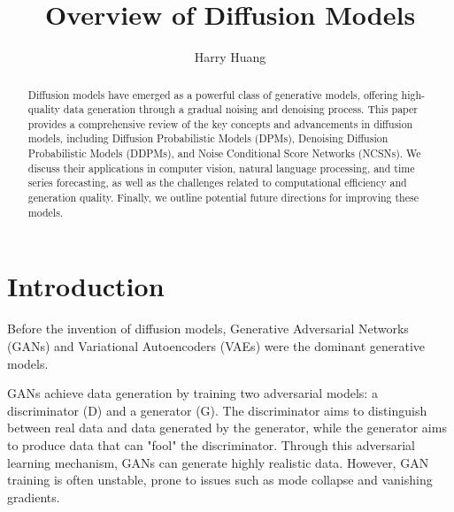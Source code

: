 \documentclass[sigconf,natbib=false]{acmart}
\begin{document}
\title{Overview of Diffusion Models}

\author{Harry Huang}

\begin{abstract}
  Diffusion models have emerged as a powerful class of generative models,
  offering high-quality data generation through a gradual noising and denoising process.
  This paper provides a comprehensive review of the key concepts and advancements in diffusion models,
  including Diffusion Probabilistic Models (DPMs), Denoising Diffusion Probabilistic Models (DDPMs),
  and Noise Conditional Score Networks (NCSNs).
  We discuss their applications in computer vision, natural language processing, and time series forecasting,
  as well as the challenges related to computational efficiency and generation quality.
  Finally, we outline potential future directions for improving these models.
\end{abstract}


\maketitle

\section{Introduction}
Before the invention of diffusion models,
Generative Adversarial Networks (GANs) and Variational Autoencoders (VAEs)
were the dominant generative models.

GANs achieve data generation by training two adversarial models:
a discriminator (D) and a generator (G).
The discriminator aims to distinguish between real data and data generated by the generator,
while the generator aims to produce data that can "fool" the discriminator.
Through this adversarial learning mechanism, GANs can generate highly realistic data.
However, GAN training is often unstable,
prone to issues such as mode collapse and vanishing gradients. \cite{weng2018}
\end{document}
